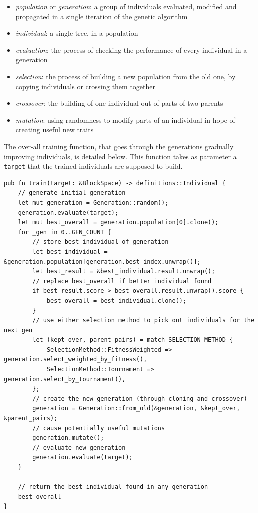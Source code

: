 \documentclass{report}
\begin{document}
\begin{itemize}
    \item \emph{population} or \emph{generation}: a group of individuals evaluated, modified and propagated in a single iteration of the genetic algorithm
    \item \emph{individual}: a single tree, in a population
    \item \emph{evaluation}: the process of checking the performance of every individual in a generation
    \item \emph{selection}: the process of building a new population from the old one, by copying individuals or crossing them together
    \item \emph{crossover}: the building of one individual out of parts of two parents
    \item \emph{mutation}: using randomness to modify parts of an individual in hope of creating useful new traits
\end{itemize}

The over-all training function, that goes through the generations gradually improving individuals, is detailed below. This function takes as parameter a \verb|target| that the trained individuals are supposed to build.

\begin{verbatim}
pub fn train(target: &BlockSpace) -> definitions::Individual {
    // generate initial generation
    let mut generation = Generation::random();
    generation.evaluate(target);
    let mut best_overall = generation.population[0].clone();
    for _gen in 0..GEN_COUNT {
        // store best individual of generation
        let best_individual = &generation.population[generation.best_index.unwrap()];
        let best_result = &best_individual.result.unwrap();
        // replace best_overall if better individual found
        if best_result.score > best_overall.result.unwrap().score {
            best_overall = best_individual.clone();
        }
        // use either selection method to pick out individuals for the next gen
        let (kept_over, parent_pairs) = match SELECTION_METHOD {
            SelectionMethod::FitnessWeighted => generation.select_weighted_by_fitness(),
            SelectionMethod::Tournament => generation.select_by_tournament(),
        };
        // create the new generation (through cloning and crossover)
        generation = Generation::from_old(&generation, &kept_over, &parent_pairs);
        // cause potentially useful mutations
        generation.mutate();
        // evaluate new generation
        generation.evaluate(target);
    }

    // return the best individual found in any generation
    best_overall
}
\end{verbatim}
\end{document}
